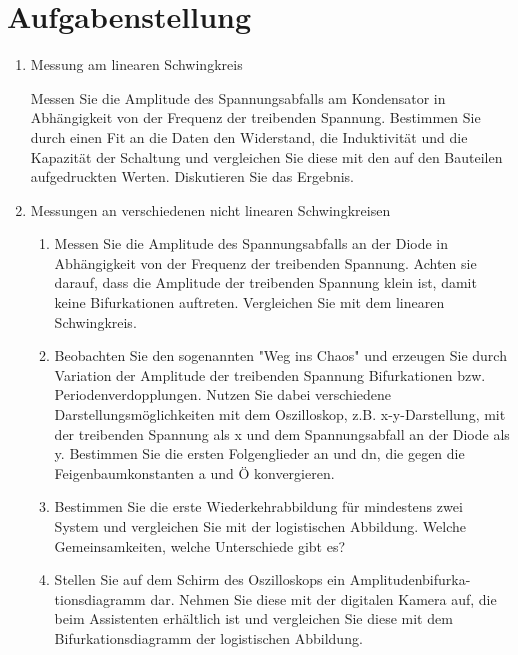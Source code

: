 \section{Aufgabenstellung}

\begin{enumerate}
\item Messung am linearen Schwingkreis

Messen Sie die Amplitude des Spannungsabfalls am Kondensator in 
Abhängigkeit von der Frequenz der treibenden Spannung. Bestimmen Sie durch 
einen Fit an die Daten den Widerstand, die Induktivität und die Kapazität der 
Schaltung und vergleichen Sie diese mit den auf den Bauteilen aufgedruckten 
Werten. Diskutieren Sie das Ergebnis. 

\item Messungen an verschiedenen nicht linearen Schwingkreisen 

\begin{enumerate}

\item Messen Sie die Amplitude des Spannungsabfalls an der Diode in 
Abhängigkeit von der Frequenz der treibenden Spannung. Achten sie     
darauf, dass die Amplitude der treibenden Spannung klein ist, damit        
keine Bifurkationen auftreten. Vergleichen Sie mit dem linearen          
Schwingkreis. 
\item Beobachten Sie den sogenannten "Weg ins Chaos" und erzeugen Sie 
durch Variation der Amplitude der treibenden Spannung Bifurkationen 
bzw. Periodenverdopplungen. Nutzen Sie dabei verschiedene 
Darstellungsmöglichkeiten mit dem Oszilloskop, z.B. x-y-Darstellung, mit 
der treibenden Spannung als x und dem Spannungsabfall an der Diode 
als y. Bestimmen Sie die ersten Folgenglieder an und dn, die gegen die 
Feigenbaumkonstanten a und Ö konvergieren. 
\item Bestimmen Sie die erste Wiederkehrabbildung für mindestens zwei 
 System und vergleichen Sie mit der logistischen Abbildung. Welche 
Gemeinsamkeiten, welche Unterschiede gibt es? 
\item Stellen Sie auf dem Schirm des Oszilloskops ein Amplitudenbifurka- 
tionsdiagramm dar. Nehmen Sie diese mit der digitalen Kamera auf, die 
beim Assistenten erhältlich ist und vergleichen Sie diese mit dem 
Bifurkationsdiagramm der logistischen Abbildung.

\end{enumerate}
\end{enumerate}